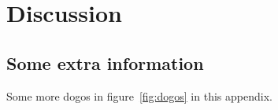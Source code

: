 \documentclass[12pt, a4paper, oneside]{article}
\begin{document}
\blindtext[2]

\clearpage


\section{Discussion} \label{sec:summary}

\blindtext[3]

\clearpage


\nocite{*}

{
    \raggedright
    \printbibliography
}

\clearpage


\appendix
{} \label{sec:appendix}

\renewcommand{\thesubsection}{\Alph{subsection}}



\subsection{Some extra information} \label{appendix:extra}

Some more dogos in figure~\ref{fig:dogos} in this appendix. \medskip
\end{document}
